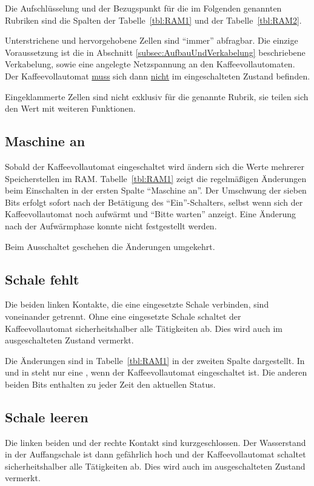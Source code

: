 Die Aufschlüsselung und der Bezugspunkt für die im Folgenden genannten Rubriken sind die Spalten der Tabelle~\ref{tbl:RAM1} und der Tabelle~\ref{tbl:RAM2}.

Unterstrichene und hervorgehobene Zellen sind "`immer"' abfragbar.
Die einzige Voraussetzung ist die in Abschnitt \ref{subsec:AufbauUndVerkabelung} beschriebene Verkabelung, sowie eine angelegte Netzspannung an den Kaffeevollautomaten.
Der Kaffeevollautomat \underline{muss} sich dann \underline{nicht} im eingeschalteten Zustand befinden.

Eingeklammerte Zellen sind nicht exklusiv für die genannte Rubrik, sie teilen sich den Wert mit weiteren Funktionen.

\subsection{Maschine an}
Sobald der Kaffeevollautomat eingeschaltet wird ändern sich die Werte mehrerer Speicherstellen im \ac{RAM}.
Tabelle~\ref{tbl:RAM1} zeigt die regelmäßigen Änderungen beim Einschalten in der ersten Spalte "`Maschine an"'.
Der Umschwung der sieben Bits erfolgt sofort nach der Betätigung des "`Ein"'-Schalters, selbst wenn sich der Kaffeevollautomat noch aufwärmt und "`Bitte warten"' anzeigt.
Eine Änderung nach der Aufwärmphase konnte nicht festgestellt werden.

Beim Ausschaltet geschehen die Änderungen umgekehrt.

\subsection{Schale fehlt}
Die beiden linken Kontakte, die eine eingesetzte Schale verbinden, sind voneinander getrennt.
Ohne eine eingesetzte Schale schaltet der Kaffeevollautomat sicherheitshalber alle Tätigkeiten ab.
Dies wird auch im ausgeschalteten Zustand vermerkt.

Die Änderungen sind in Tabelle~\ref{tbl:RAM1} in der zweiten Spalte dargestellt.
In  und in  steht nur eine , wenn der Kaffeevollautomat eingeschaltet ist.
Die anderen beiden Bits enthalten zu jeder Zeit den aktuellen Status.

\subsection{Schale leeren}
Die linken beiden und der rechte Kontakt sind kurzgeschlossen.
Der Wasserstand in der Auffangschale ist dann gefährlich hoch und der Kaffeevollautomat schaltet sicherheitshalber alle Tätigkeiten ab.
Dies wird auch im ausgeschalteten Zustand vermerkt.

